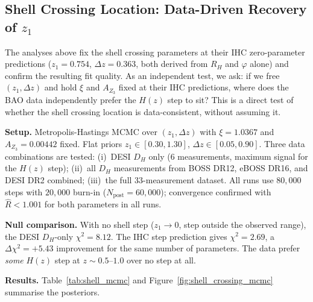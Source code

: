 \documentclass[12pt,a4paper]{article}
\begin{document}
\subsection{Shell Crossing Location: Data-Driven Recovery of $z_1$}
\label{sec:mcmc_shell}

The analyses above fix the shell crossing parameters at their IHC zero-parameter
predictions ($z_1 = 0.754$, $\Delta z = 0.363$, both derived from $R_H$ and
$\varphi$ alone) and confirm the resulting fit quality.  As an independent test,
we ask: if we free $(z_1, \Delta z)$ and hold $\xi$ and $A_{Z_3}$ fixed at their
IHC predictions, where does the BAO data independently prefer the $H(z)$ step to
sit?  This is a direct test of whether the shell crossing location is data-consistent,
without assuming it.

\textbf{Setup.}  Metropolis-Hastings MCMC over $(z_1, \Delta z)$ with $\xi = 1.0367$
and $A_{Z_3} = 0.00442$ fixed.  Flat priors $z_1 \in [0.30, 1.30]$,
$\Delta z \in [0.05, 0.90]$.  Three data combinations are tested: (i)~DESI
$D_H$ only (6 measurements, maximum signal for the $H(z)$ step);
(ii)~all $D_H$ measurements from BOSS DR12, eBOSS DR16, and DESI DR2
combined; (iii)~the full 33-measurement dataset.  All runs use
$80{,}000$ steps with $20{,}000$ burn-in ($N_\mathrm{post} = 60{,}000$);
convergence confirmed with $\hat{R} < 1.001$ for both parameters in all runs.

\textbf{Null comparison.}  With no shell step ($z_1 \to 0$, step outside the
observed range), the DESI $D_H$-only $\chi^2 = 8.12$.  The IHC step prediction
gives $\chi^2 = 2.69$, a $\Delta\chi^2 = +5.43$ improvement for the same number
of parameters.  The data prefer \emph{some} $H(z)$ step at $z \sim 0.5$--$1.0$
over no step at all.

\textbf{Results.}  Table~\ref{tab:shell_mcmc} and Figure~\ref{fig:shell_crossing_mcmc}
summarise the posteriors.
\end{document}
